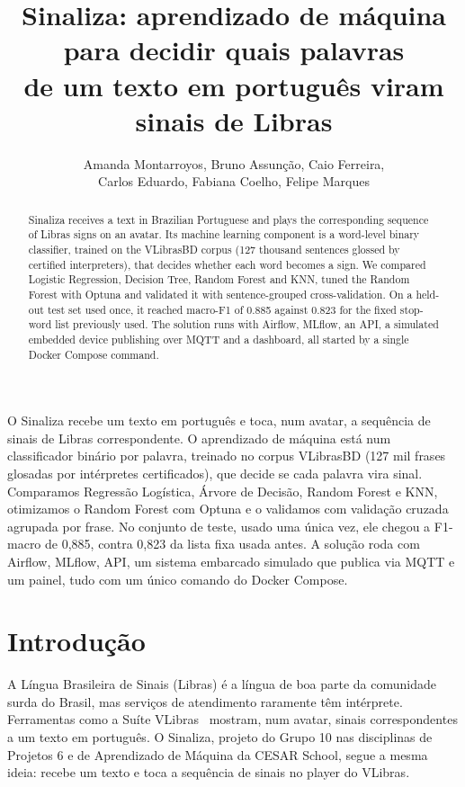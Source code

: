 \documentclass[12pt]{article}
\title{Sinaliza: aprendizado de máquina para decidir quais palavras\\
de um texto em português viram sinais de Libras}
\author{Amanda Montarroyos\inst{1}, Bruno Assunção\inst{1}, Caio Ferreira\inst{1},\\
  Carlos Eduardo\inst{1}, Fabiana Coelho\inst{1}, Felipe Marques\inst{1}}
\begin{document}
\maketitle

\begin{abstract}
  Sinaliza receives a text in Brazilian Portuguese and plays the corresponding sequence of Libras
  signs on an avatar. Its machine learning component is a word-level binary classifier, trained on
  the VLibrasBD corpus (127 thousand sentences glossed by certified interpreters), that decides whether
  each word becomes a sign. We compared Logistic Regression, Decision Tree, Random Forest and KNN,
  tuned the Random Forest with Optuna and validated it with sentence-grouped cross-validation. On a
  held-out test set used once, it reached macro-F1 of 0.885 against 0.823 for the fixed stop-word list
  previously used. The solution runs with Airflow, MLflow, an API, a simulated embedded device
  publishing over MQTT and a dashboard, all started by a single Docker Compose command.
\end{abstract}

\begin{resumo}
  O Sinaliza recebe um texto em português e toca, num avatar, a sequência de sinais de Libras
  correspondente. O aprendizado de máquina está num classificador binário por palavra, treinado no
  corpus VLibrasBD (127 mil frases glosadas por intérpretes certificados), que decide se cada palavra
  vira sinal. Comparamos Regressão Logística, Árvore de Decisão, Random Forest e KNN, otimizamos o
  Random Forest com Optuna e o validamos com validação cruzada agrupada por frase. No conjunto de teste,
  usado uma única vez, ele chegou a F1-macro de 0,885, contra 0,823 da lista fixa usada antes. A solução
  roda com Airflow, MLflow, API, um sistema embarcado simulado que publica via MQTT e um painel, tudo
  com um único comando do Docker Compose.
\end{resumo}

\section{Introdução}

A Língua Brasileira de Sinais (Libras) é a língua de boa parte da comunidade surda do Brasil, mas
serviços de atendimento raramente têm intérprete. Ferramentas como a Suíte VLibras~\cite{vlibras:26}
mostram, num avatar, sinais correspondentes a um texto em português. O Sinaliza, projeto do Grupo 10
nas disciplinas de Projetos 6 e de Aprendizado de Máquina da CESAR School, segue a mesma ideia: recebe
um texto e toca a sequência de sinais no player do VLibras.
\end{document}
